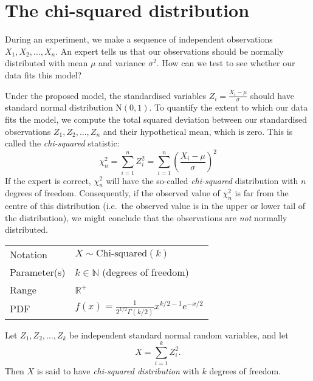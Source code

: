 \documentclass[lecture]{csm}
\newcommand{\N}{\mathbb{N}}
\newcommand{\R}{\mathbb{R}}
\begin{document}
\newpage
\section{The chi-squared distribution}
During an experiment, we make a sequence of independent observations $X_1,X_2,\ldots,X_n$. An expert tells us that our observations should be normally distributed with mean $\mu$ and variance $\sigma^2$. How can we test to see whether our data fits this model?

Under the proposed model, the standardised variables $\displaystyle Z_i = \frac{X_i-\mu}{\sigma}$ should have standard normal distribution $\text{N}(0,1)$. To quantify the extent to which our data fits the model, we compute the total squared deviation between our standardised observations $Z_1,Z_2,\ldots,Z_n$ and their hypothetical mean, which is zero. This is called the \emph{chi-squared} statistic:
\[
\chi^2_n = \sum_{i=1}^n Z_i^2 = \sum_{i=1}^n \left(\frac{X_i-\mu}{\sigma}\right)^2
\]
If the expert is correct, $\chi^2_n$ will have the so-called \emph{chi-squared} distribution with $n$ degrees of freedom. Consequently, if the observed value of $\chi^2_n$ is far from the centre of this distribution (i.e.\ the observed value is in the upper or lower tail of the distribution), we might conclude that the observations are \emph{not} normally distributed.

\begin{center}
\begin{tabular}{ll}\hline
Notation			& $X\sim\text{Chi-squared}(k)$ \\
Parameter(s)		& $k \in \N$ \quad (degrees of freedom) \\
Range			& $\R^{+}$ \\
PDF				& $f(x) = \displaystyle\frac{1}{2^{k/2}\Gamma(k/2)} x^{k/2-1} e^{-x/2}$ \\[2ex] \hline
\end{tabular}
\end{center}

Let $Z_1,Z_2,\ldots,Z_k$ be independent standard normal random variables, and let
\[
\displaystyle X=\sum_{i=1}^k Z_i^2.
\]
Then $X$ is said to have \emph{chi-squared distribution} with $k$ degrees of freedom.

\newpage
\end{document}
